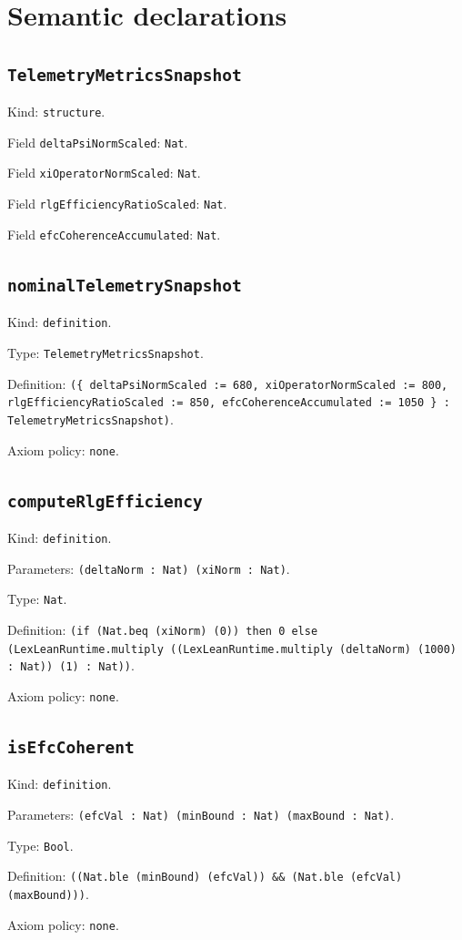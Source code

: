 \documentclass[11pt]{article}
\begin{document}
\section*{Semantic declarations}
\subsection*{\texttt{TelemetryMetricsSnapshot}}
\noindent Kind: \texttt{structure}.\par
\noindent Field \texttt{deltaPsiNormScaled}: \texttt{Nat}.\par
\noindent Field \texttt{xiOperatorNormScaled}: \texttt{Nat}.\par
\noindent Field \texttt{rlgEfficiencyRatioScaled}: \texttt{Nat}.\par
\noindent Field \texttt{efcCoherenceAccumulated}: \texttt{Nat}.\par
\subsection*{\texttt{nominalTelemetrySnapshot}}
\noindent Kind: \texttt{definition}.\par
\noindent Type: \texttt{TelemetryMetricsSnapshot}.\par
\noindent Definition: \texttt{(\{ deltaPsiNormScaled := 680, xiOperatorNormScaled := 800, rlgEfficiencyRatioScaled := 850, efcCoherenceAccumulated := 1050 \} : TelemetryMetricsSnapshot)}.\par
\noindent Axiom policy: \texttt{none}.\par
\subsection*{\texttt{computeRlgEfficiency}}
\noindent Kind: \texttt{definition}.\par
\noindent Parameters: \texttt{(deltaNorm : Nat) (xiNorm : Nat)}.\par
\noindent Type: \texttt{Nat}.\par
\noindent Definition: \texttt{(if (Nat.beq (xiNorm) (0)) then 0 else (LexLeanRuntime.multiply ((LexLeanRuntime.multiply (deltaNorm) (1000) : Nat)) (1) : Nat))}.\par
\noindent Axiom policy: \texttt{none}.\par
\subsection*{\texttt{isEfcCoherent}}
\noindent Kind: \texttt{definition}.\par
\noindent Parameters: \texttt{(efcVal : Nat) (minBound : Nat) (maxBound : Nat)}.\par
\noindent Type: \texttt{Bool}.\par
\noindent Definition: \texttt{((Nat.ble (minBound) (efcVal)) \&\& (Nat.ble (efcVal) (maxBound)))}.\par
\noindent Axiom policy: \texttt{none}.\par
\end{document}
